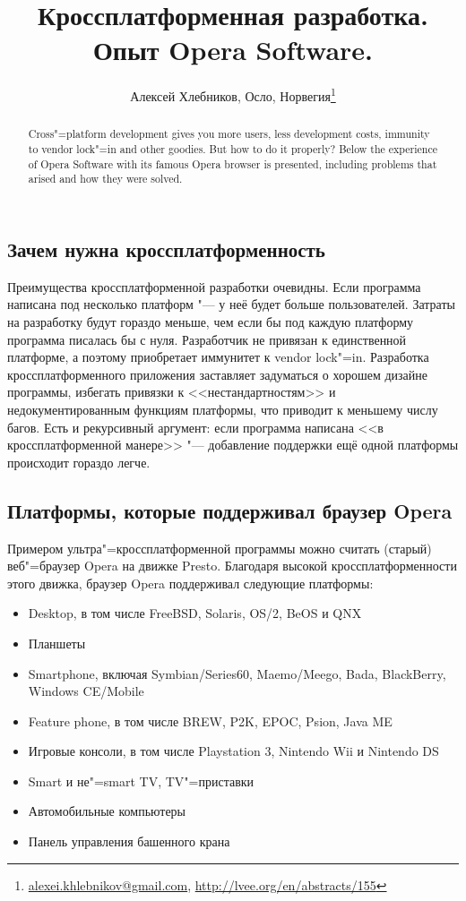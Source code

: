 \documentclass[10pt, a5paper]{article}
\begin{document}
\title{Кроссплатформенная разработка. Опыт Opera Software.}
\author{Алексей Хлебников, Осло, Норвегия\footnote{\url{alexei.khlebnikov@gmail.com}, \url{http://lvee.org/en/abstracts/155}}}
\maketitle
\begin{abstract}
Cross"=platform development gives you more users, less development costs, immunity to vendor lock"=in and other goodies. But how to do it properly? Below the experience of Opera Software with its famous Opera browser is presented, including problems that arised and how they were solved.
\end{abstract}
\subsection*{Зачем нужна кроссплатформенность}

Преимущества кроссплатформенной разработки очевидны. Если программа написана под несколько платформ "--- у неё будет больше пользователей. Затраты на разработку будут гораздо меньше, чем если бы под каждую платформу программа писалась бы с нуля. Разработчик не привязан к единственной платформе, а поэтому приобретает иммунитет к vendor lock"=in. Разработка кроссплатформенного приложения заставляет задуматься о хорошем дизайне программы, избегать привязки к <<нестандартностям>> и недокументированным функциям платформы, что приводит к меньшему числу багов. Есть и рекурсивный аргумент: если программа написана <<в кроссплатформенной манере>> "--- добавление поддержки ещё одной платформы происходит гораздо легче.

\subsection*{Платформы, которые поддерживал браузер Opera}

Примером ультра"=кроссплатформенной программы можно считать (старый) веб"=браузер Opera на движке Presto. Благодаря высокой кроссплатформенности этого движка, браузер Opera поддерживал следующие платформы:

\begin{itemize}
  \item Desktop, в том числе FreeBSD, Solaris, OS/2, BeOS и QNX
  \item Планшеты
  \item Smartphone, включая Symbian/Series60, Maemo/Meego, Bada, BlackBerry, Windows CE/Mobile
  \item Feature phone, в том числе BREW, P2K, EPOC, Psion, Java ME
  \item Игровые консоли, в том числе Playstation 3, Nintendo Wii и Nintendo DS
  \item Smart и не"=smart TV, TV"=приставки
  \item Автомобильные компьютеры
  \item Панель управления башенного крана
\end{itemize}
\end{document}
